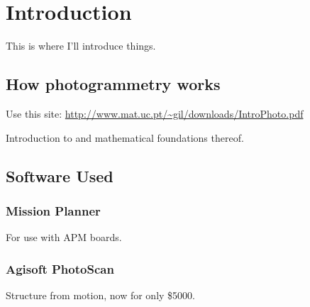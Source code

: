 \section{Introduction}

This is where I'll introduce things.

\subsection{How photogrammetry works}

Use this site: \url{http://www.mat.uc.pt/~gil/downloads/IntroPhoto.pdf}

Introduction to and mathematical foundations thereof.

\subsection{Software Used}

\subsubsection{Mission Planner}

For use with APM boards.

\subsubsection{Agisoft PhotoScan}

Structure from motion, now for only \$5000.
